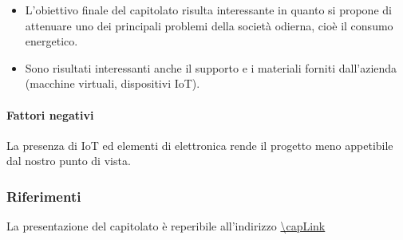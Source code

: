 \begin{itemize}
    \item L'obiettivo finale del capitolato risulta interessante in quanto si propone di attenuare uno dei principali problemi della società odierna, cioè il consumo energetico.
    \item Sono risultati interessanti anche il supporto e i materiali forniti dall'azienda (macchine virtuali, dispositivi IoT).
\end{itemize}

\paragraph{Fattori negativi}
La presenza di IoT ed elementi di elettronica rende il progetto meno appetibile dal nostro punto di vista.

\subsubsection{Riferimenti}
La presentazione del capitolato è reperibile all'indirizzo \url{\capLink}
